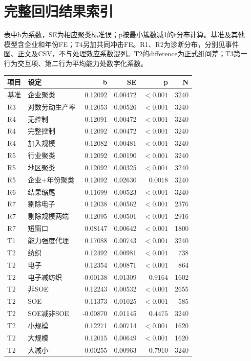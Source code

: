 \documentclass[UTF8,11pt,fontset=none]{ctexart}
\begin{document}
\section{完整回归结果索引}
表中b为系数，SE为相应聚类标准误；p按最小簇数减1的t分布计算。基准及其他模型含企业和年份FE；T4另加共同冲击FE。R1、R2为诊断分布，分别见事件图、正文及CSV，不与处理效应系数混列。T2的difference为正式组间差；T3第一行为交互项、第二行为平均能力处数字化系数。
\small
\begin{longtable}{llrrrr}
\toprule 项目 & 设定 & b & SE & p & N\\\midrule\endhead
基准 & 企业聚类 & 0.12092 & 0.00472 & $<0.001$ & 3240\\
R3 & 对数劳动生产率 & 0.12053 & 0.00526 & $<0.001$ & 3240\\
R4 & 无控制 & 0.12091 & 0.00472 & $<0.001$ & 3240\\
R4 & 完整控制 & 0.12092 & 0.00472 & $<0.001$ & 3240\\
R4 & 加入规模 & 0.12082 & 0.00481 & $<0.001$ & 3240\\
R5 & 行业聚类 & 0.12092 & 0.00190 & $<0.001$ & 3240\\
R5 & 地区聚类 & 0.12092 & 0.00325 & $<0.001$ & 3240\\
R5 & 企业+年份聚类 & 0.12092 & 0.02630 & $0.0018$ & 3240\\
R6 & 结果缩尾 & 0.11699 & 0.00523 & $<0.001$ & 3240\\
R7 & 剔除电子 & 0.12038 & 0.00562 & $<0.001$ & 2376\\
R7 & 剔除规模两端 & 0.12095 & 0.00501 & $<0.001$ & 2916\\
R7 & 短窗口 & 0.08147 & 0.00642 & $<0.001$ & 1800\\
T1 & 能力强度代理 & 0.17088 & 0.00743 & $<0.001$ & 3240\\
T2 & 纺织 & 0.12492 & 0.00981 & $<0.001$ & 738\\
T2 & 电子 & 0.12354 & 0.00871 & $<0.001$ & 864\\
T2 & 电子减纺织 & -0.00138 & 0.01309 & $0.9164$ & 1602\\
T2 & 非SOE & 0.12243 & 0.00532 & $<0.001$ & 2655\\
T2 & SOE & 0.11373 & 0.01025 & $<0.001$ & 585\\
T2 & SOE减非SOE & -0.00870 & 0.01145 & $0.4475$ & 3240\\
T2 & 小规模 & 0.12271 & 0.00714 & $<0.001$ & 1620\\
T2 & 大规模 & 0.12015 & 0.00649 & $<0.001$ & 1620\\
T2 & 大减小 & -0.00255 & 0.00963 & $0.7910$ & 3240\\

\end{longtable}
\end{document}
